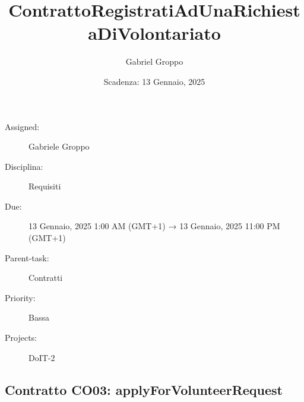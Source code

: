 \title{ContrattoRegistratiAdUnaRichiestaDiVolontariato}
\author{Gabriel Groppo}
\date{Scadenza: 13 Gennaio, 2025}

\maketitle

\begin{description}
    \item[Assigned:] Gabriele Groppo
    \item[Disciplina:] Requisiti
    \item[Due:] 13 Gennaio, 2025 1:00 AM (GMT+1) → 13 Gennaio, 2025 11:00 PM (GMT+1)
    \item[Parent-task:] Contratti
    \item[Priority:] Bassa
    \item[Projects:] DoIT-2
\end{description}

\subsection*{Contratto \textbf{CO03}: applyForVolunteerRequest}

